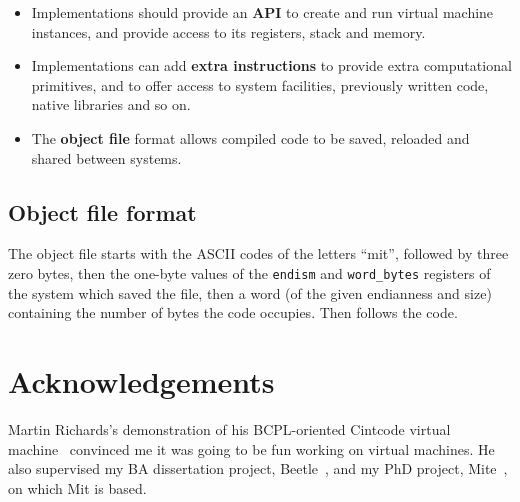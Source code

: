 \documentclass[a4paper]{article}
\begin{document}
\begin{itemize}
\item Implementations should provide an \textbf{API} to create and run virtual machine instances, and provide access to its registers, stack and memory.
\item Implementations can add \textbf{extra instructions} to provide extra computational primitives, and to offer access to system facilities, previously written code, native libraries and so on.
\item The \textbf{object file} format allows compiled code to be saved, reloaded and shared between systems.
\end{itemize}


\subsection{Object file format}
\label{object}

The object file starts with the ASCII codes of the letters
``mit'', followed by three zero bytes, then the one-byte values of
the {\tt endism} and {\tt word\_bytes} registers of the system which saved the file, then a word (of the given endianness and size) containing the number of bytes the code occupies. Then follows the code.


\section*{Acknowledgements}

Martin Richards's demonstration of his BCPL-oriented Cintcode virtual machine~\cite{cintweb}
convinced me it was going to be fun working on virtual machines. He also supervised my BA dissertation project, Beetle~\cite{beetledis}, and my PhD project, Mite~\cite{mite0}, on which Mit is based.



\end{document}
